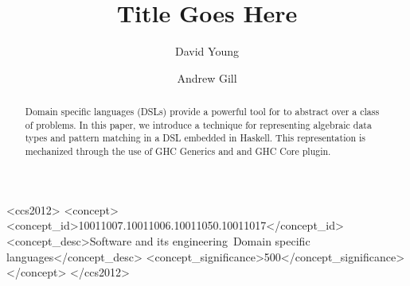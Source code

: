 \documentclass[sigplan,screen]{acmart}
\begin{document}
\title{Title Goes Here}

\author{David Young}


\author{Andrew Gill}


\begin{abstract}
  Domain specific languages (DSLs) provide a powerful tool for to abstract over
  a class of problems. In this paper, we introduce a technique for representing
  algebraic data types and pattern matching in a DSL embedded in Haskell. This
  representation is mechanized through the use of GHC Generics and and GHC Core plugin.
\end{abstract}

\begin{CCSXML}
<ccs2012>
   <concept>
       <concept_id>10011007.10011006.10011050.10011017</concept_id>
       <concept_desc>Software and its engineering~Domain specific languages</concept_desc>
       <concept_significance>500</concept_significance>
       </concept>
 </ccs2012>
\end{CCSXML}


\end{document}
